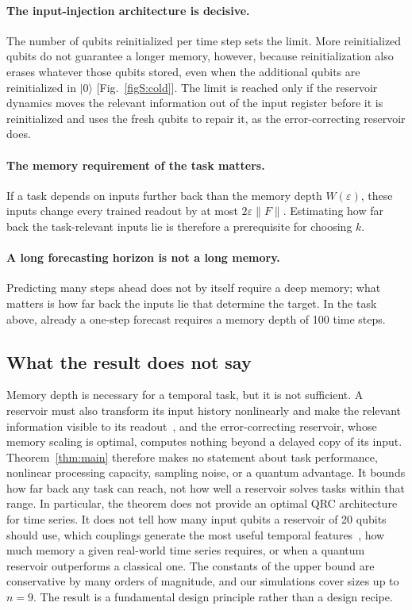 \documentclass[aps,prl,twocolumn,superscriptaddress,floatfix]{revtex4-2}
\theoremstyle{plain}
\newcommand{\ket}[1]{|#1\rangle}
\newcommand{\Norm}[1]{\lVert #1\rVert}
\begin{document}
\paragraph*{The input-injection architecture is decisive.} The number of qubits reinitialized per time step sets the limit. More reinitialized qubits do not guarantee a longer memory, however, because reinitialization also erases whatever those qubits stored, even when the additional qubits are reinitialized in $\ket0$ [Fig.~\ref{figS:cold}]. The limit is reached only if the reservoir dynamics moves the relevant information out of the input register before it is reinitialized and uses the fresh qubits to repair it, as the error-correcting reservoir does.

\paragraph*{The memory requirement of the task matters.} If a task depends on inputs further back than the memory depth $W(\varepsilon)$, these inputs change every trained readout by at most $2\varepsilon\Norm F$. Estimating how far back the task-relevant inputs lie is therefore a prerequisite for choosing $k$.

\paragraph*{A long forecasting horizon is not a long memory.} Predicting many steps ahead does not by itself require a deep memory; what matters is how far back the inputs lie that determine the target. In the task above, already a one-step forecast requires a memory depth of 100 time steps.

\subsection{What the result does not say}

Memory depth is necessary for a temporal task, but it is not sufficient. A reservoir must also transform its input history nonlinearly and make the relevant information visible to its readout~\cite{Cao2026}, and the error-correcting reservoir, whose memory scaling is optimal, computes nothing beyond a delayed copy of its input. Theorem~\ref{thm:main} therefore makes no statement about task performance, nonlinear processing capacity, sampling noise, or a quantum advantage. It bounds how far back any task can reach, not how well a reservoir solves tasks within that range. In particular, the theorem does not provide an optimal QRC architecture for time series. It does not tell how many input qubits a reservoir of 20 qubits should use, which couplings generate the most useful temporal features~\cite{MartinezPena2021,Cao2026}, how much memory a given real-world time series requires, or when a quantum reservoir outperforms a classical one. The constants of the upper bound are conservative by many orders of magnitude, and our simulations cover sizes up to $n=9$. The result is a fundamental design principle rather than a design recipe.
\end{document}
